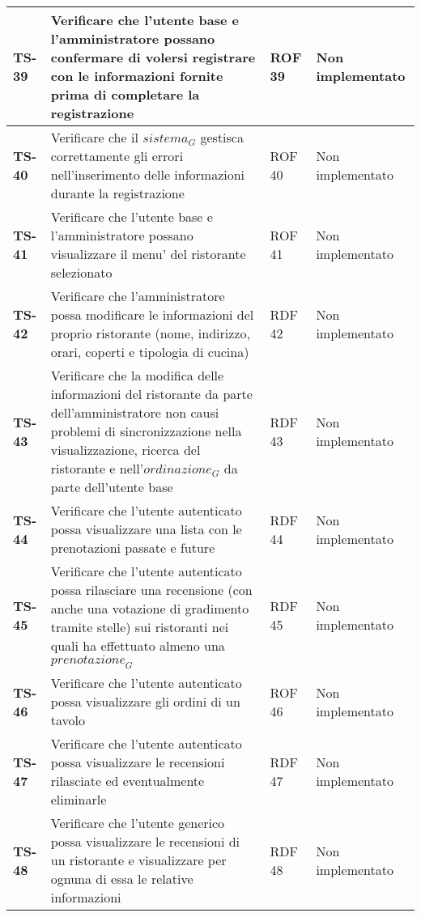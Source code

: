 \begin{longtable}{|>{\centering\arraybackslash}p{1.5cm}|p{9.8cm}|p{2cm}|p{3.5cm}|}
    \hline
    \rowcolor{gray!10}
    \textbf{TS-39} & Verificare che l'utente base e l'amministratore possano confermare di volersi registrare con le informazioni fornite prima di completare la registrazione & ROF 39 & Non implementato \\ 
    \hline
    \rowcolor{gray!10}
    \textbf{TS-40} & Verificare che il $\textit{sistema}_G$ gestisca correttamente gli errori nell'inserimento delle informazioni durante la registrazione & ROF 40 & Non implementato \\ 
    \hline
    \rowcolor{gray!10}
    \textbf{TS-41} & Verificare che l'utente base e l'amministratore possano visualizzare il menu' del ristorante selezionato & ROF 41 & Non implementato \\ 
    \hline
    \rowcolor{gray!10}
    \textbf{TS-42} & Verificare che l'amministratore possa modificare le informazioni del proprio ristorante (nome, indirizzo, orari, coperti e tipologia di cucina) & RDF 42 & Non implementato \\
    \hline
    \rowcolor{gray!10}
    \textbf{TS-43} & Verificare che la modifica delle informazioni del ristorante da parte dell'amministratore non causi problemi di sincronizzazione nella visualizzazione, ricerca del ristorante e nell'$\textit{ordinazione}_G$ da parte dell'utente base & RDF 43 & Non implementato \\ 
    \hline
    \rowcolor{gray!10}
    \textbf{TS-44} & Verificare che l'utente autenticato possa visualizzare una lista con le prenotazioni passate e future & RDF 44 & Non implementato \\ 
    \hline
    \rowcolor{gray!10}
    \textbf{TS-45} & Verificare che l'utente autenticato possa rilasciare una recensione (con anche una votazione di gradimento tramite stelle) sui ristoranti nei quali ha effettuato almeno una $\textit{prenotazione}_G$ & RDF 45 & Non implementato \\ 
    \hline
    \rowcolor{gray!10}
    \textbf{TS-46} & Verificare che l'utente autenticato possa visualizzare gli ordini di un tavolo & ROF 46 & Non implementato \\ 
    \hline
    \rowcolor{gray!10}
    \textbf{TS-47} & Verificare che l'utente autenticato possa visualizzare le recensioni rilasciate ed eventualmente eliminarle & RDF 47 & Non implementato \\ 
    \hline
    \rowcolor{gray!10}
    \textbf{TS-48} & Verificare che l'utente generico possa visualizzare le recensioni di un ristorante e visualizzare per ognuna di essa le relative informazioni & RDF 48 & Non implementato \\ 

\end{longtable}
